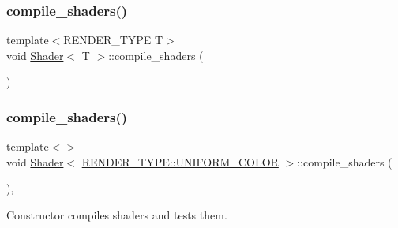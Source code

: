 \mbox{\label{classShader_a1176d69a08aef6df3b7850104871a839}} 
\subsubsection{\texorpdfstring{compile\+\_\+shaders()}{compile\_shaders()}\hspace{0.1cm}{\footnotesize\ttfamily [2/6]}}
{\footnotesize\ttfamily template$<$R\+E\+N\+D\+E\+R\+\_\+\+T\+Y\+PE T$>$ \\
void \mbox{\hyperlink{classShader}{Shader}}$<$ T $>$\+::compile\+\_\+shaders (\begin{DoxyParamCaption}{ }\end{DoxyParamCaption})\hspace{0.3cm}{\ttfamily [protected]}}

\mbox{\label{classShader_a3ffd553eceda4e9d5a1d8b4a5a157659}} 
\subsubsection{\texorpdfstring{compile\+\_\+shaders()}{compile\_shaders()}\hspace{0.1cm}{\footnotesize\ttfamily [3/6]}}
{\footnotesize\ttfamily template$<$$>$ \\
void \mbox{\hyperlink{classShader}{Shader}}$<$ \mbox{\hyperlink{shader__class_8hpp_a24e288e18eb7b6e01de7565001fedb60aa98862073f71a928bad5099cc3e1c2ed}{R\+E\+N\+D\+E\+R\+\_\+\+T\+Y\+P\+E\+::\+U\+N\+I\+F\+O\+R\+M\+\_\+\+C\+O\+L\+OR}} $>$\+::compile\+\_\+shaders (\begin{DoxyParamCaption}{ }\end{DoxyParamCaption})\hspace{0.3cm}{\ttfamily [inline]}, {\ttfamily [protected]}}



Constructor compiles shaders and tests them. 

\mbox{\label{classShader_a3ffd553eceda4e9d5a1d8b4a5a157659}} 
